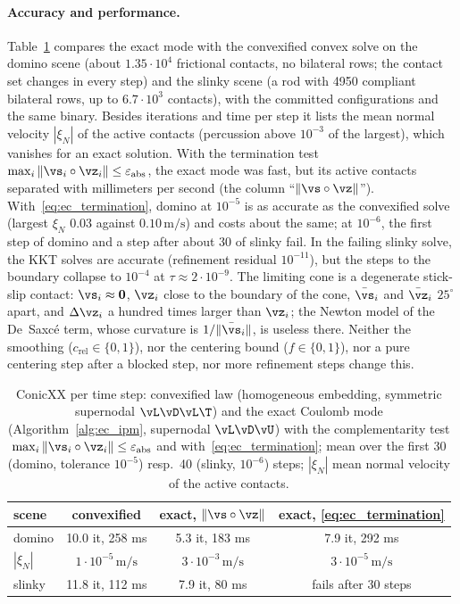 \paragraph{Accuracy and performance.} Table~\ref{tab:ec_scenes} compares the exact mode with the convexified convex solve on the domino scene (about $1.35 \cdot 10^4$ frictional contacts, no bilateral rows; the contact set changes in every step) and the slinky scene (a rod with 4950 compliant bilateral rows, up to $6.7 \cdot 10^3$ contacts), with the committed configurations  and the same binary. Besides iterations and time per step it lists the mean normal velocity $|\xi_N|$ of the active contacts (percussion above $10^{-3}$ of the largest), which vanishes for an exact solution. With the termination test $\max_i\|\vs_i\circ\vz_i\| \leq \varepsilon_\mathrm{abs}$, the exact mode was fast, but its active contacts separated with millimeters per second (the column ``$\|\vs\circ\vz\|$''). With~\eqref{eq:ec_termination}, domino at $10^{-5}$ is as accurate as the convexified solve (largest $\xi_N$ $0.03$ against $0.10\,\mathrm{m/s}$) and costs about the same; at $10^{-6}$, the first step of domino and a step after about 30 of slinky fail. In the failing slinky solve, the KKT solves are accurate (refinement residual $10^{-11}$), but the steps to the boundary collapse to $10^{-4}$ at $\tau \approx 2 \cdot 10^{-9}$. The limiting cone is a degenerate stick-slip contact: $\vs_i \approx \mathbf{0}$, $\vz_i$ close to the boundary of the cone, $\bar{\vs}_i$ and $\bar{\vz}_i$ $25^\circ$ apart, and $\Delta\vz_i$ a hundred times larger than $\vz_i$; the Newton model of the De~Saxc\'e term, whose curvature is $1/\|\bar{\vs}_i\|$, is useless there. Neither the smoothing ($c_\mathrm{rel} \in \{0, 1\}$), nor the centering bound ($f \in \{0, 1\}$), nor a pure centering step after a blocked step, nor more refinement steps change this.
%
\begin{table}[t]
	\centering
	\small
	\caption{ConicXX per time step: convexified law (homogeneous embedding, symmetric supernodal $\vL\vD\vL\T$) and the exact Coulomb mode (Algorithm~\ref{alg:ec_ipm}, supernodal $\vL\vD\vU$) with the complementarity test $\max_i\|\vs_i\circ\vz_i\| \leq \varepsilon_\mathrm{abs}$ and with~\eqref{eq:ec_termination}; mean over the first 30 (domino, tolerance $10^{-5}$) resp.\ 40 (slinky, $10^{-6}$) steps; $|\xi_N|$ mean normal velocity of the active contacts.}
	\label{tab:ec_scenes}
	\begin{tabular}{lccc}
		\toprule
		scene & convexified & exact, $\|\vs\circ\vz\|$ & exact, \eqref{eq:ec_termination} \\
		\midrule
		domino & 10.0 it, 258 ms & 5.3 it, 183 ms & 7.9 it, 292 ms \\
		$|\xi_N|$ & $1 \cdot 10^{-5}\,\mathrm{m/s}$ & $3 \cdot 10^{-3}\,\mathrm{m/s}$ & $3 \cdot 10^{-5}\,\mathrm{m/s}$ \\
		slinky & 11.8 it, 112 ms & 7.9 it, 80 ms & fails after 30 steps \\
		\bottomrule
	\end{tabular}
\end{table}
%
